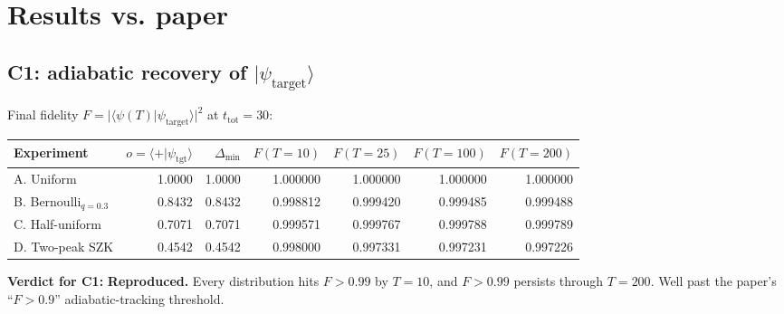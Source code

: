 \documentclass[11pt]{article}
\begin{document}
\section{Results vs. paper}

\subsection{C1: adiabatic recovery of $|\psi_\text{target}\rangle$}
Final fidelity $F=|\langle\psi(T)|\psi_\text{target}\rangle|^2$ at $t_\text{tot}=30$:
\begin{center}
\begin{tabular}{@{}lrrrrrr@{}}
\toprule
Experiment & $o=\langle+|\psi_\text{tgt}\rangle$ & $\Delta_\min$ & $F(T{=}10)$ & $F(T{=}25)$ & $F(T{=}100)$ & $F(T{=}200)$ \\
\midrule
A. Uniform & 1.0000 & 1.0000 & 1.000000 & 1.000000 & 1.000000 & 1.000000 \\
B. Bernoulli$_{q=0.3}$ & 0.8432 & 0.8432 & 0.998812 & 0.999420 & 0.999485 & 0.999488 \\
C. Half-uniform & 0.7071 & 0.7071 & 0.999571 & 0.999767 & 0.999788 & 0.999789 \\
D. Two-peak SZK & 0.4542 & 0.4542 & 0.998000 & 0.997331 & 0.997231 & 0.997226 \\
\bottomrule
\end{tabular}
\end{center}
\textbf{Verdict for C1:} \textbf{Reproduced.} Every distribution hits $F > 0.99$ by $T=10$,
and $F > 0.99$ persists through $T = 200$. Well past the paper's ``$F > 0.9$''
adiabatic-tracking threshold.
\end{document}
